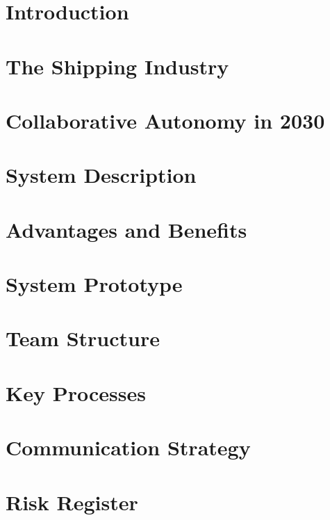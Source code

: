 \documentclass[twoside,a4paper,12pt]{article}
\begin{document}
    \setlength{\parskip}{0.5em}
    
    \newpage
    \tableofcontents
    
	\newpage

	\section{Introduction}
	
	\newpage
	\section{The Shipping Industry}
	
	\newpage
	\section{Collaborative Autonomy in 2030}
	
	\newpage
	\section{System Description}
	
	\newpage
	\section{Advantages and Benefits}
	
	\newpage
	\section{System Prototype}
	
	\newpage
	\section{Team Structure}
	\label{team_structure}
	
	\newpage
	\section{Key Processes}
	
	\newpage
	\section{Communication Strategy}
	
	\newpage
	\section{Risk Register}
	
\end{document}
